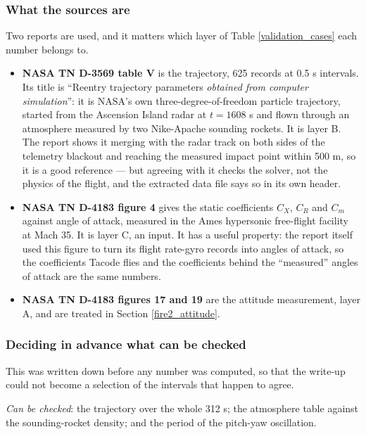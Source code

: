 \documentclass[11pt,a4paper]{article}
\begin{document}
\subsubsection{What the sources are}

Two reports are used, and it matters which layer of Table \ref{validation_cases} each
number belongs to.

\begin{itemize}
\item \textbf{NASA TN D-3569 table V} \cite{Lewis1966} is the trajectory, 625 records at
0.5 s intervals. Its title is ``Reentry trajectory parameters \emph{obtained from computer
simulation}'': it is NASA's own three-degree-of-freedom particle trajectory, started from
the Ascension Island radar at $t = 1608$ s and flown through an atmosphere measured by two
Nike-Apache sounding rockets. It is layer B. The report shows it merging with the radar
track on both sides of the telemetry blackout and reaching the measured impact point
within 500 m, so it is a good reference --- but agreeing with it checks the solver, not
the physics of the flight, and the extracted data file says so in its own header.
\item \textbf{NASA TN D-4183 figure 4} \cite{Scallion1967} gives the static coefficients
$C_X$, $C_R$ and $C_m$ against angle of attack, measured in the Ames hypersonic
free-flight facility at Mach 35. It is layer C, an input. It has a useful property: the
report itself used this figure to turn its flight rate-gyro records into angles of attack,
so the coefficients Tacode flies and the coefficients behind the ``measured'' angles of
attack are the same numbers.
\item \textbf{NASA TN D-4183 figures 17 and 19} are the attitude measurement, layer A, and
are treated in Section \ref{fire2_attitude}.
\end{itemize}

\subsubsection{Deciding in advance what can be checked}

This was written down before any number was computed, so that the write-up could not
become a selection of the intervals that happen to agree.

\emph{Can be checked}: the trajectory over the whole 312 s; the atmosphere table against
the sounding-rocket density; and the period of the pitch-yaw oscillation.
\end{document}
